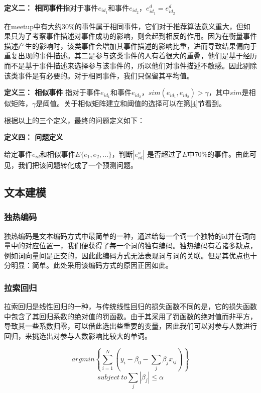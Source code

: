 \documentclass[12pt]{template}
\begin{document}
\textbf{定义二： 相同事件}指对于事件\(e_{id_1}\)和事件\(e_{id_2}\)，\(e_{id_1}^d=e_{id_2}^d\)

在meetup中有大约30\%的事件属于相同事件，它们对于推荐算法意义重大，但如果只为了考察事件描述对事件成功的影响，则会起到相反的作用。因为在衡量事件描述产生的影响时，该类事件会增加其事件描述的影响比重，进而导致结果偏向于重复出现的事件描述。其二是参与这类事件的人有着很大的重叠，他们是基于经历而不是基于事件描述来选择参与该事件的，所以他们对事件描述不敏感。因此剔除该类事件是有必要的。对于相同事件，我们只保留其平均值。

\textbf{定义三： 相似事件}
指对于事件\(e_{id_1}\)和事件\(e_{id_2}\)，\(sim(e_{id_1},e_{id_2})>\gamma\)，其中\(sim\)是相似矩阵，\(\gamma\)是阈值。关于相似矩阵建立和阈值的选择可以在第\ref{4}节看到。

根据以上的三个定义，最终的问题定义如下：

\textbf{定义四： 问题定义}

给定事件\(e_{id}\)和相似事件\(E\{e_1,e_2,...\}\)，判断\(|e_{id}^a|\)
是否超过了\(E\)中70\%的事件。由此可见，我们把该问题转化成了一个预测问题。

\subsection{文本建模}

\subsubsection{独热编码}

独热编码是文本编码方式中最简单的一种，通过给每一个词一个独特的id并在词向量中的对应位置一，我们便获得了每一个词的独有编码。独热编码有着诸多缺点，例如词向量间是正交的，因此此编码方式无法表现词与词的关联。但是其优点也十分明显：简单。此处采用该编码方式的原因正因如此。

\subsubsection{拉索回归}

拉索回归是线性回归的一种，与传统线性回归的损失函数不同的是，它的损失函数中包含了其回归系数的绝对值的罚函数。由于其采用了罚函数的绝对值而非平方，导致其一些系数归零，可以借此选出些重要的变量\cite{tibshirani_regression_1996}，因此我们可以对参与人数进行回归，来挑选出对参与人数影响比较大的单词\cite{noauthor_predicting_nodate}。

\[
argmin\left\{\displaystyle\sum_{i=1}^N\left(y_i-\beta_0-\displaystyle\sum_j\beta_jx_{ij}\right)\right\}
\] \[subject\ to \displaystyle\sum_j|\beta_j|\leq\alpha\]\\
\end{document}
